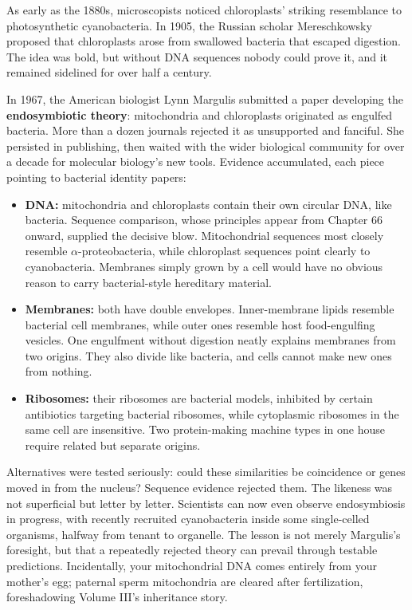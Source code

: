\begin{zhengju}
As early as the 1880s, microscopists noticed chloroplasts' striking resemblance to photosynthetic cyanobacteria. In 1905, the Russian scholar Mereschkowsky proposed that chloroplasts arose from swallowed bacteria that escaped digestion. The idea was bold, but without DNA sequences nobody could prove it, and it remained sidelined for over half a century.

In 1967, the American biologist Lynn Margulis submitted a paper developing the \textbf{endosymbiotic theory}: mitochondria and chloroplasts originated as engulfed bacteria. More than a dozen journals rejected it as unsupported and fanciful. She persisted in publishing, then waited with the wider biological community for over a decade for molecular biology's new tools. Evidence accumulated, each piece pointing to bacterial identity papers:

\begin{itemize}[itemsep=2pt]
\item \textbf{DNA:} mitochondria and chloroplasts contain their own circular DNA, like bacteria. Sequence comparison, whose principles appear from Chapter 66 onward, supplied the decisive blow. Mitochondrial sequences most closely resemble $\alpha$-proteobacteria, while chloroplast sequences point clearly to cyanobacteria. Membranes simply grown by a cell would have no obvious reason to carry bacterial-style hereditary material.
\item \textbf{Membranes:} both have double envelopes. Inner-membrane lipids resemble bacterial cell membranes, while outer ones resemble host food-engulfing vesicles. One engulfment without digestion neatly explains membranes from two origins. They also divide like bacteria, and cells cannot make new ones from nothing.
\item \textbf{Ribosomes:} their ribosomes are bacterial models, inhibited by certain antibiotics targeting bacterial ribosomes, while cytoplasmic ribosomes in the same cell are insensitive. Two protein-making machine types in one house require related but separate origins.
\end{itemize}

Alternatives were tested seriously: could these similarities be coincidence or genes moved in from the nucleus? Sequence evidence rejected them. The likeness was not superficial but letter by letter. Scientists can now even observe endosymbiosis in progress, with recently recruited cyanobacteria inside some single-celled organisms, halfway from tenant to organelle. The lesson is not merely Margulis's foresight, but that a repeatedly rejected theory can prevail through testable predictions. Incidentally, your mitochondrial DNA comes entirely from your mother's egg; paternal sperm mitochondria are cleared after fertilization, foreshadowing Volume III's inheritance story.
\end{zhengju}


